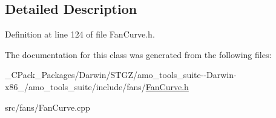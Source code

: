 \subsection{Detailed Description}


Definition at line 124 of file Fan\+Curve.\+h.



The documentation for this class was generated from the following files\+:\begin{DoxyCompactItemize}
\item 
\+\_\+\+C\+Pack\+\_\+\+Packages/\+Darwin/\+S\+T\+G\+Z/amo\+\_\+tools\+\_\+suite-\/-\/\+Darwin-\/x86\+\_/amo\+\_\+tools\+\_\+suite/include/fans/\hyperlink{___c_pack___packages_2_darwin_2_s_t_g_z_2amo__tools__suite--_darwin-x86__64_2amo__tools__suite_2include_2fans_2_fan_curve_8h}{Fan\+Curve.\+h}\item 
src/fans/Fan\+Curve.\+cpp\end{DoxyCompactItemize}
